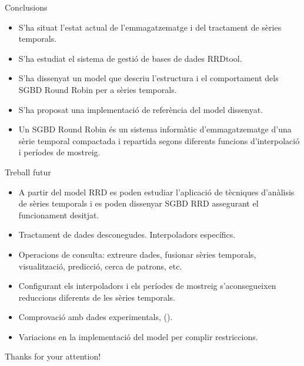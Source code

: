 \begin{frame}{Conclusions}

  \begin{itemize}
  \item S'ha situat l'estat actual de l'emmagatzematge i del tractament de sèries temporals.

  \item S'ha estudiat el sistema de gestió de bases de dades RRDtool.

  \item S'ha dissenyat un model que descriu l'estructura i el
    comportament dels SGBD Round Robin per a sèries temporals.
  
  \item S'ha proposat una implementació de referència del model dissenyat.


 \item Un SGBD Round Robin és un sistema informàtic d'emmagatzematge d'una sèrie temporal compactada i repartida segons diferents funcions d'interpolació i períodes de mostreig.

  \end{itemize}

\end{frame}




\begin{frame}{Treball futur}

\begin{itemize}

\item A partir del model RRD es poden estudiar l'aplicació de tècniques d'anàlisis de sèries temporals  i es poden dissenyar SGBD RRD assegurant el funcionament desitjat.


\item Tractament de dades desconegudes. Interpoladors específics.

\item Operacions de consulta: extreure dades, fusionar sèries temporals, visualització, predicció, cerca de patrons, etc.

\item Configurant els interpoladors i els períodes de mostreig s'aconsegueixen reduccions diferents de les sèries temporals.

\item Comprovació amb dades experimentals, (\cite{keogh02}).

\item Variacions en la implementació del model per complir restriccions.

\end{itemize}
\end{frame}


\begin{frame}

\begin{center}
{\huge
Thanks for your attention!
}
\end{center}

\end{frame}

